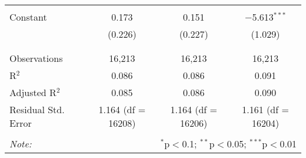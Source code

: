 \begin{table}[!htbp]
\begin{tabular}{@{\extracolsep{5pt}}lccc}
  & & & \\ 
 Constant & 0.173 & 0.151 & $-$5.613$^{***}$ \\ 
  & (0.226) & (0.227) & (1.029) \\ 
  & & & \\ 
\hline \\[-1.8ex] 
Observations & 16,213 & 16,213 & 16,213 \\ 
R$^{2}$ & 0.086 & 0.086 & 0.091 \\ 
Adjusted R$^{2}$ & 0.085 & 0.086 & 0.090 \\ 
Residual Std. Error & 1.164 (df = 16208) & 1.164 (df = 16206) & 1.161 (df = 16204) \\ 
\hline 
\hline \\[-1.8ex] 
\textit{Note:}  & \multicolumn{3}{r}{$^{*}$p$<$0.1; $^{**}$p$<$0.05; $^{***}$p$<$0.01} \\ 
\end{tabular} 
\end{table} 
